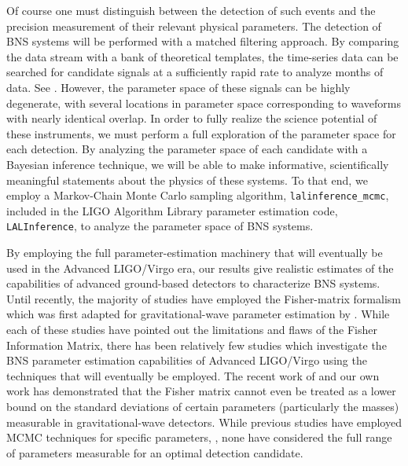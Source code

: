 \documentclass[11pt,a4paper]{emulateapj} 
\begin{document}
Of course one must distinguish between the detection of such events
and the precision measurement of their relevant physical parameters.
The detection of BNS systems will be performed with a matched
filtering approach.  By comparing the data stream with a bank of
theoretical templates, the time-series data can be searched for
candidate signals at a sufficiently rapid rate to analyze months of
data.  See \cite{S6search}.  However, the parameter space
of these signals can be highly degenerate, with several locations in
parameter space corresponding to waveforms with nearly identical overlap.  In order
to fully realize the science potential of these instruments, we must
perform a full exploration of the parameter space for each detection.
By analyzing the parameter space of each candidate with a Bayesian
inference technique, we will be able to make informative, scientifically
meaningful statements about the physics of these systems.  To that
end, we employ a Markov-Chain Monte Carlo sampling algorithm,
\texttt{lalinference\_mcmc}, included in the LIGO Algorithm Library
parameter estimation code, \texttt{LALInference}, to analyze the
parameter space of BNS systems.

By employing the full parameter-estimation machinery that will
eventually be used in the Advanced LIGO/Virgo era, our results
 give realistic estimates of the capabilities of
advanced ground-based detectors to characterize BNS systems.  Until
recently, the majority of studies have employed the Fisher-matrix
formalism which was first adapted for gravitational-wave parameter
estimation by \citet{FinnDetection}.  While each of these studies
\citep{PoissonWill,CutlerFlanagan,ArunPE} have pointed out the
limitations and flaws of the Fisher Information Matrix, there has been
relatively few studies which investigate the BNS parameter estimation capabilities
of Advanced LIGO/Virgo using the techniques that will eventually be
employed.  The recent work of \cite{Vallisneri} and our own work
\citep{Inadequacies} has demonstrated that the Fisher matrix cannot
even be treated as a lower bound on the standard deviations of certain
parameters (particularly the masses) measurable in gravitational-wave
detectors.  While previous studies have employed MCMC techniques for specific
parameters,  \citep{Nissanke2011,Nissanke2013,Veitch2012}, none have considered 
the full range of parameters measurable for an optimal detection candidate.
\end{document}
